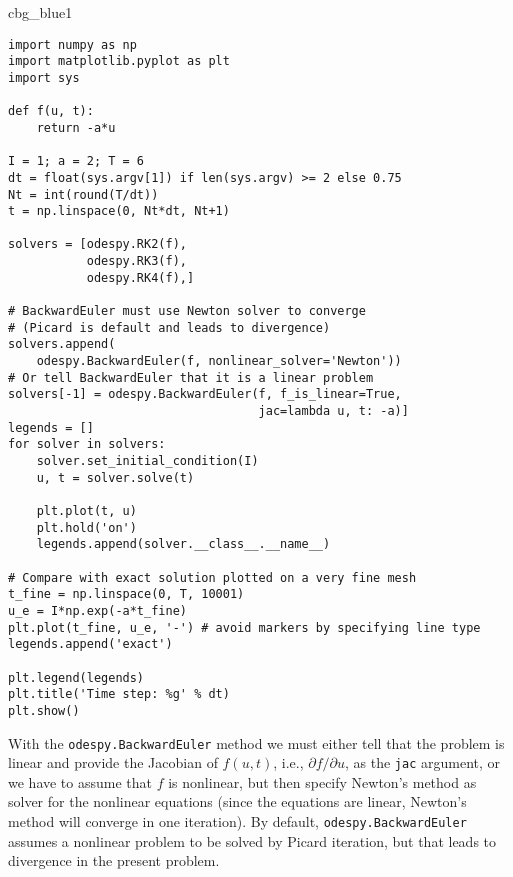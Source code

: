 \documentclass[graybox,sectrefs,envcountresetchap,open=right,final]{svmonodo}
\newenvironment{_cod_tight}[1]{
   \def\FrameCommand{\colorbox{#1}}
   \FrameRule0.6pt\MakeFramed {\FrameRestore}\vskip3mm}
   {\vskip0mm\endMakeFramed}
\newenvironment{cod}[1]{
\bgroup\rmfamily
\fboxsep=0mm\relax
\begin{_cod_tight}{#1}
\list{}{\parsep=-2mm\parskip=0mm\topsep=0pt\leftmargin=2mm
\rightmargin=2\leftmargin\leftmargin=4pt\relax}
\item\relax}
{\endlist\end{_cod_tight}\egroup}
\begin{document}
\begin{cod}{cbg_blue1}\begin{Verbatim}[numbers=none,fontsize=\fontsize{9pt}{9pt},baselinestretch=0.95,xleftmargin=2mm]
import numpy as np
import matplotlib.pyplot as plt
import sys

def f(u, t):
    return -a*u

I = 1; a = 2; T = 6
dt = float(sys.argv[1]) if len(sys.argv) >= 2 else 0.75
Nt = int(round(T/dt))
t = np.linspace(0, Nt*dt, Nt+1)

solvers = [odespy.RK2(f),
           odespy.RK3(f),
           odespy.RK4(f),]

# BackwardEuler must use Newton solver to converge
# (Picard is default and leads to divergence)
solvers.append(
    odespy.BackwardEuler(f, nonlinear_solver='Newton'))
# Or tell BackwardEuler that it is a linear problem
solvers[-1] = odespy.BackwardEuler(f, f_is_linear=True,
                                   jac=lambda u, t: -a)]
legends = []
for solver in solvers:
    solver.set_initial_condition(I)
    u, t = solver.solve(t)

    plt.plot(t, u)
    plt.hold('on')
    legends.append(solver.__class__.__name__)

# Compare with exact solution plotted on a very fine mesh
t_fine = np.linspace(0, T, 10001)
u_e = I*np.exp(-a*t_fine)
plt.plot(t_fine, u_e, '-') # avoid markers by specifying line type
legends.append('exact')

plt.legend(legends)
plt.title('Time step: %g' % dt)
plt.show()
\end{Verbatim}
\end{cod}
\noindent
With the \texttt{odespy.BackwardEuler} method we must either tell that
the problem is linear and provide the Jacobian of $f(u,t)$, i.e.,
$\partial f/\partial u$, as the \texttt{jac} argument, or we have to assume
that $f$ is nonlinear, but then specify Newton's method as solver
for the nonlinear equations (since the equations are linear, Newton's
method will converge in one iteration). By default,
\texttt{odespy.BackwardEuler} assumes a nonlinear problem to be solved by
Picard iteration, but that leads to divergence in the present problem.
\end{document}

